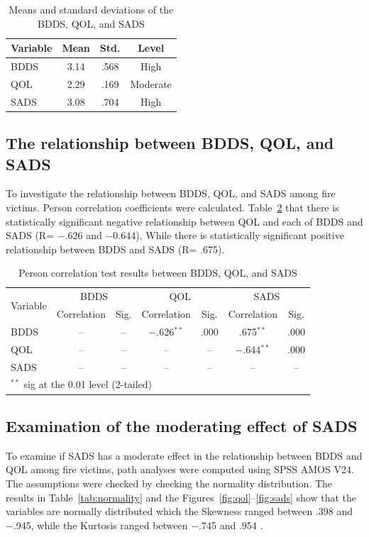\documentclass{NSP1}
\begin{document}
\begin{table}[!ht]
\centering
\caption{Means and standard deviations of the BDDS, QOL, and SADS}
\label{tab:means}
\begin{tabular}{lccc}
\hline
Variable & Mean & Std. & Level \\
\hline
BDDS & 3.14 & .568 & High \\
QOL  & 2.29 & .169 & Moderate \\
SADS & 3.08 & .704 & High \\
\hline
\end{tabular}
\end{table}

\subsection{The relationship between BDDS, QOL, and SADS}
To investigate the relationship between BDDS, QOL, and SADS among fire victims. Person correlation coefficients were calculated. Table~\ref{tab:corr} that there is statistically significant negative relationship between QOL and each of BDDS and SADS (R= $-$.626 and $-$0.644). While there is statistically significant positive relationship between BDDS and SADS (R= .675).

\begin{table}[!ht]
\centering
\caption{Person correlation test results between BDDS, QOL, and SADS}
\label{tab:corr}
\begin{tabular}{lcccccc}
\hline
\multirow{2}{*}{Variable} & \multicolumn{2}{c}{BDDS} & \multicolumn{2}{c}{QOL} & \multicolumn{2}{c}{SADS} \\
 & Correlation & Sig. & Correlation & Sig. & Correlation & Sig. \\
\hline
BDDS & -- & -- & $-$.626$^{**}$ & .000 & .675$^{**}$ & .000 \\
QOL  & -- & -- & -- & -- & $-$.644$^{**}$ & .000 \\
SADS & -- & -- & -- & -- & -- & -- \\
\hline
\multicolumn{7}{l}{\footnotesize $^{**}$ sig at the 0.01 level (2-tailed)} \\
\end{tabular}
\end{table}

\subsection{Examination of the moderating effect of SADS}
To examine if SADS has a moderate effect in the relationship between BDDS and QOL among fire victims, path analyses were computed using SPSS AMOS V24. The assumptions were checked by checking the normality distribution. The results in Table~\ref{tab:normality} and the Figures~\ref{fig:qol}--\ref{fig:sads} show that the variables are normally distributed which the Skewness ranged between .398 and $-$.945, while the Kurtosis ranged between $-$.745 and .954 \cite{Hair2018}.
\end{document}
